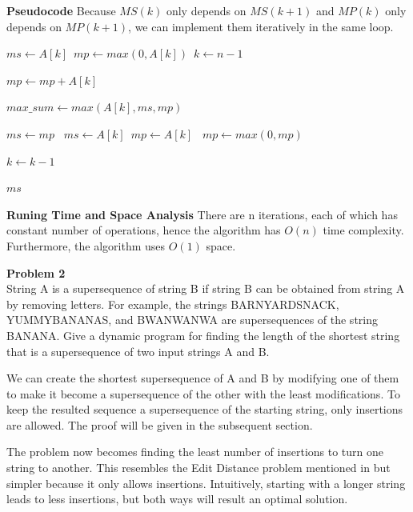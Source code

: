 \documentclass[12pt,article]{article}
\newenvironment{problem}[2][Problem]
    { \begin{mdframed}[backgroundcolor=gray!20] \textbf{#1 #2} \\}
    {  \end{mdframed}}
\begin{document}
\newpage
\textbf{Pseudocode}
Because $MS(k)$ only depends on $MS(k+1)$ and $MP(k)$ only depends on $MP(k+1)$, we can implement them iteratively in the same loop.

\begin{algorithm}
\caption{$(A[1:n])$}\label{alg:q1-LSA}
\begin{algorithmic}
    \State $ms \gets A[k]$\
    \State $mp \gets max(0, A[k])$\
    \State $k \gets n - 1$\;
    
        \State $mp \gets mp + A[k]$

        \State $max\_sum \gets max(A[k], ms, mp)$\

            \State $ms \gets mp$\
            \State $ms \gets A[k]$\
            \State $mp \gets A[k]$\
        \Else
            \State $mp \gets max(0, mp)$\
        \EndIf

        \State $k \gets k - 1$
    \EndWhile

    \Return $ms$
\end{algorithmic}
\end{algorithm}

\textbf{Runing Time and Space Analysis}
There are n iterations, each of which has constant number of operations, hence the algorithm has $O(n)$ time complexity. Furthermore, the algorithm uses $O(1)$ space.

\newpage
\begin{problem}{2} 
String A is a supersequence of string B if string B can be obtained from string A by removing letters. For example, the strings BARNYARDSNACK, YUMMYBANANAS, and BWANWANWA are supersequences of the string BANANA. Give a dynamic program for finding the length of the shortest string that is a supersequence of two input strings A and B.
\end{problem}

We can create the shortest supersequence of A and B by modifying one of them to make it become a supersequence of the other with the least modifications. To keep the resulted sequence a supersequence of the starting string, only insertions are allowed. The proof will be given in the subsequent section. 

The problem now becomes finding the least number of insertions to turn one string to another. This resembles the Edit Distance problem mentioned in \cite{JeffE19} but simpler because it only allows insertions. Intuitively, starting with a longer string leads to less insertions, but both ways will result an optimal solution.
\end{document}
